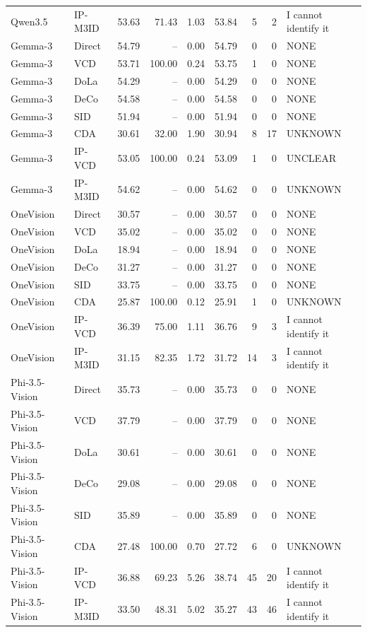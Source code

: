 \begin{longtable}{llrrrrrrl}
Qwen3.5 & IP-M3ID & 53.63 & 71.43 & 1.03 & 53.84 & 5 & 2 & I cannot identify it\\
Gemma-3 & Direct & 54.79 & -- & 0.00 & 54.79 & 0 & 0 & NONE\\
Gemma-3 & VCD & 53.71 & 100.00 & 0.24 & 53.75 & 1 & 0 & NONE\\
Gemma-3 & DoLa & 54.29 & -- & 0.00 & 54.29 & 0 & 0 & NONE\\
Gemma-3 & DeCo & 54.58 & -- & 0.00 & 54.58 & 0 & 0 & NONE\\
Gemma-3 & SID & 51.94 & -- & 0.00 & 51.94 & 0 & 0 & NONE\\
Gemma-3 & CDA & 30.61 & 32.00 & 1.90 & 30.94 & 8 & 17 & UNKNOWN\\
Gemma-3 & IP-VCD & 53.05 & 100.00 & 0.24 & 53.09 & 1 & 0 & UNCLEAR\\
Gemma-3 & IP-M3ID & 54.62 & -- & 0.00 & 54.62 & 0 & 0 & UNKNOWN\\
OneVision & Direct & 30.57 & -- & 0.00 & 30.57 & 0 & 0 & NONE\\
OneVision & VCD & 35.02 & -- & 0.00 & 35.02 & 0 & 0 & NONE\\
OneVision & DoLa & 18.94 & -- & 0.00 & 18.94 & 0 & 0 & NONE\\
OneVision & DeCo & 31.27 & -- & 0.00 & 31.27 & 0 & 0 & NONE\\
OneVision & SID & 33.75 & -- & 0.00 & 33.75 & 0 & 0 & NONE\\
OneVision & CDA & 25.87 & 100.00 & 0.12 & 25.91 & 1 & 0 & UNKNOWN\\
OneVision & IP-VCD & 36.39 & 75.00 & 1.11 & 36.76 & 9 & 3 & I cannot identify it\\
OneVision & IP-M3ID & 31.15 & 82.35 & 1.72 & 31.72 & 14 & 3 & I cannot identify it\\
Phi-3.5-Vision & Direct & 35.73 & -- & 0.00 & 35.73 & 0 & 0 & NONE\\
Phi-3.5-Vision & VCD & 37.79 & -- & 0.00 & 37.79 & 0 & 0 & NONE\\
Phi-3.5-Vision & DoLa & 30.61 & -- & 0.00 & 30.61 & 0 & 0 & NONE\\
Phi-3.5-Vision & DeCo & 29.08 & -- & 0.00 & 29.08 & 0 & 0 & NONE\\
Phi-3.5-Vision & SID & 35.89 & -- & 0.00 & 35.89 & 0 & 0 & NONE\\
Phi-3.5-Vision & CDA & 27.48 & 100.00 & 0.70 & 27.72 & 6 & 0 & UNKNOWN\\
Phi-3.5-Vision & IP-VCD & 36.88 & 69.23 & 5.26 & 38.74 & 45 & 20 & I cannot identify it\\
Phi-3.5-Vision & IP-M3ID & 33.50 & 48.31 & 5.02 & 35.27 & 43 & 46 & I cannot identify it\\
\end{longtable}\endgroup


